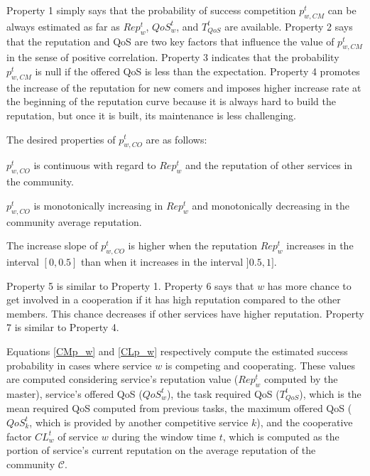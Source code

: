 \noindent Property 1 simply says that the probability of success
competition $p_{w,CM}^t$ can be always estimated as far as
$Rep^t_w$, $QoS_w^t$, and $T_{QoS}^t$ are available. Property 2
says that the reputation and QoS are two key factors that
influence the value of $p_{w,CM}^t$ in the sense of positive
correlation. Property 3 indicates that the probability
$p_{w,CM}^t$ is null if the offered QoS is less than the
expectation. Property 4 promotes the increase of the reputation
for new comers and imposes higher increase rate at the beginning
of the reputation curve because it is always hard to build the
reputation, but once it is built, its maintenance is less
challenging.


\noindent The desired properties of $p_{w,CO}^t$ are as follows:

\begin{property}
$p_{w,CO}^t$ is continuous with regard to $Rep^t_w$ and the
reputation of other services in the community.
\end{property}
%
\begin{property}
$p_{w,CO}^t$  is monotonically increasing in $Rep^t_w$ and
 monotonically decreasing in the community average reputation.
\end{property}
%
%
%
\begin{property}
The increase slope of $p_{w,CO}^t$ is higher when the reputation
$Rep^t_w$ increases in the interval $[0, 0.5]$ than when it
increases in the interval $]0.5, 1]$.
\end{property}

\noindent Property 5 is similar to Property 1. Property 6 says
that $w$ has more chance to get involved in a cooperation if it
has high reputation compared to the other members. This chance
decreases if other services have higher reputation. Property 7 is
similar to Property 4.

Equations  \ref{CMp_w} and \ref{CLp_w} respectively compute the
estimated success probability in cases where service $w$ is
competing and cooperating. These values are computed considering
service's reputation value ($Rep^t_w$ computed by the master),
service's offered QoS ($QoS^t_w$), the task required QoS
($T_{QoS}^t$), which is the mean required QoS computed from
previous tasks, the maximum offered QoS ($QoS_k^t$, which is
provided by another competitive service $k$), and the cooperative
factor $CL_w^t$ of service $w$ during the window time $t$, which
is computed as the portion of service's current reputation on the
average reputation of the community $\mathcal{C}$.


